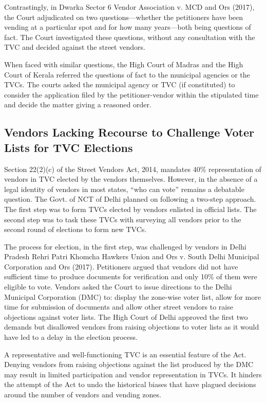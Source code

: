 \documentclass[a4paper, 12pt, twoside]{article}
\begin{document}
{Contrastingly, in Dwarka Sector 6 Vendor Association v. MCD and Ors (2017), the Court adjudicated on two questions—whether the petitioners have been vending at a particular spot and for how many years—both being questions of fact. The Court investigated these questions, without any consultation with the TVC and decided against the street vendors.

When faced with similar questions, the High Court of Madras and the High Court of Kerala referred the questions of fact to the municipal agencies or the TVCs. The courts asked the municipal agency or TVC (if constituted) to consider the application filed by the petitioner-vendor within the stipulated time and decide the matter giving a reasoned order.

\subsection*{Vendors Lacking Recourse to Challenge Voter Lists for TVC Elections}

Section 22(2)(c) of the Street Vendors Act, 2014, mandates 40\% representation of vendors in TVC elected by the vendors themselves. However, in the absence of a legal identity of vendors in most states, “who can vote” remains a debatable question.
The Govt. of NCT of Delhi planned on following a two-step approach. The first step was to form TVCs elected by vendors enlisted in official lists. The second step was to task these TVCs with surveying all vendors prior to the second round of elections to form new TVCs.

The process for election, in the first step, was challenged by vendors in Delhi Pradesh Rehri Patri Khomcha Hawkers Union and Ors v. South Delhi Municipal Corporation and Ors (2017). Petitioners argued that vendors did not have sufficient time to produce documents for verification and only 10\% of them were eligible to vote. Vendors asked the Court to issue directions to the Delhi Municipal Corporation (DMC) to: display the zone-wise voter list, allow for more time for submission of documents and allow other street vendors to raise objections against voter lists. The High Court of Delhi approved the first two demands but disallowed vendors from raising objections to voter lists as it would have led to a delay in the election process.

A representative and well-functioning TVC is an essential feature of the Act. Denying vendors from raising objections against the list produced by the DMC may result in limited participation and vendor representation in TVCs. It hinders the attempt of the Act to undo the historical biases that have plagued decisions around the number of vendors and vending zones.

}
\end{document}
